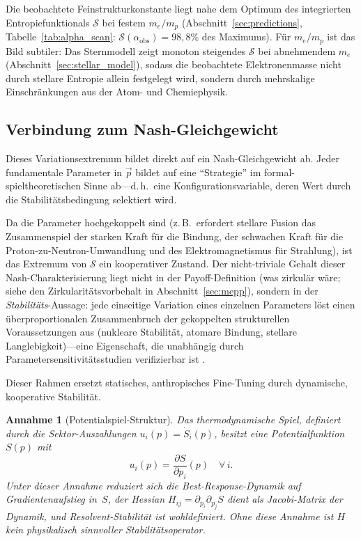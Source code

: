 \documentclass[12pt,a4paper]{article}
\newtheorem{assumption}{Annahme}
\theoremstyle{remark}
\begin{document}
Die beobachtete Feinstrukturkonstante liegt nahe dem Optimum des integrierten Entropiefunktionals $\mathcal{S}$ bei festem $m_e/m_p$ (Abschnitt~\ref{sec:predictions}, Tabelle~\ref{tab:alpha_scan}: $\mathcal{S}(\alpha_{\text{obs}}) = 98{,}8\%$ des Maximums). F\"ur $m_e/m_p$ ist das Bild subtiler: Das Sternmodell zeigt monoton steigendes $\mathcal{S}$ bei abnehmendem $m_e$ (Abschnitt~\ref{sec:stellar_model}), sodass die beobachtete Elektronenmasse nicht durch stellare Entropie allein festgelegt wird, sondern durch mehrskalige Einschr\"ankungen aus der Atom- und Chemiephysik.

\subsection{Verbindung zum Nash-Gleichgewicht}

Dieses Variationsextremum bildet direkt auf ein Nash-Gleichgewicht ab. Jeder fundamentale Parameter in $\vec{p}$ bildet auf eine ``Strategie'' im formal-spieltheoretischen Sinne ab---d.\,h.\ eine Konfigurationsvariable, deren Wert durch die Stabilit\"atsbedingung selektiert wird.

Da die Parameter hochgekoppelt sind (z.\,B.\ erfordert stellare Fusion das Zusammenspiel der starken Kraft f\"ur die Bindung, der schwachen Kraft f\"ur die Proton-zu-Neutron-Umwandlung und des Elektromagnetismus f\"ur Strahlung), ist das Extremum von $\mathcal{S}$ ein kooperativer Zustand. Der nicht-triviale Gehalt dieser Nash-Charakterisierung liegt nicht in der Payoff-Definition (was zirkul\"ar w\"are; siehe den Zirkularit\"atsvorbehalt in Abschnitt~\ref{sec:mepp}), sondern in der \emph{Stabilit\"ats}-Aussage: jede einseitige Variation eines einzelnen Parameters l\"ost einen \"uberproportionalen Zusammenbruch der gekoppelten strukturellen Voraussetzungen aus (nukleare Stabilit\"at, atomare Bindung, stellare Langlebigkeit)---eine Eigenschaft, die unabh\"angig durch Parametersensitivit\"atsstudien verifizierbar ist \citep{Adams2019}.

Dieser Rahmen ersetzt statisches, anthropisches Fine-Tuning durch dynamische, kooperative Stabilit\"at.

\begin{assumption}[Potentialspiel-Struktur]\label{ass:potential-game}
Das thermodynamische Spiel, definiert durch die Sektor-Auszahlungen $u_i(p) = \dot{S}_i(p)$, besitzt eine \emph{Potentialfunktion} $S(p)$ mit
\[
  u_i(p) = \frac{\partial S}{\partial p_i}(p) \quad \forall\, i.
\]
Unter dieser Annahme reduziert sich die Best-Response-Dynamik auf Gradientenaufstieg in~$S$, der Hessian $H_{ij} = \partial_{p_i}\partial_{p_j} S$ dient als Jacobi-Matrix der Dynamik, und Resolvent-Stabilit\"at ist wohldefiniert. Ohne diese Annahme ist $H$ kein physikalisch sinnvoller Stabilit\"atsoperator.
\end{assumption}
\end{document}
